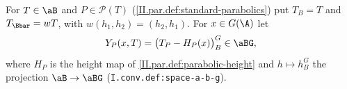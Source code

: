 For $T\in\aB$ and $P\in\mathcal P(T)$ (\cref{II.par.def:standard-parabolics}) put $T_B=T$ and $T_{\Bbar}=wT$, with $w(h_1,h_2)=(h_2,h_1)$.
For $x\in G(\A)$ let
\[
  Y_P(x,T)=\bigl(T_P-H_P(x)\bigr)_B^G\in\aBG,
\]
where $H_P$ is the height map of \cref{II.par.def:parabolic-height} and $h\mapsto h_B^G$ the projection
$\aB\to\aBG$ (\texttt{I.conv.def:space-a-b-g}).
